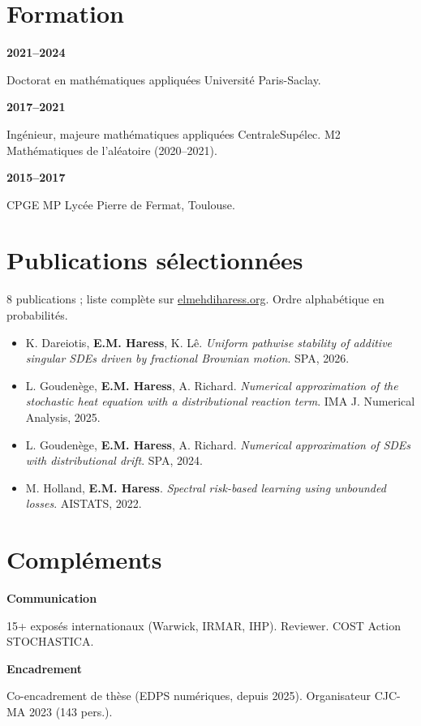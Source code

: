 \documentclass[10pt,a4paper]{article}
\newlength{\datecol}\setlength{\datecol}{0.155\textwidth}
\newlength{\gutter}\setlength{\gutter}{0.85em}
\newlength{\bodycol}
\newcommand{\skillrow}[2]{%
  \par\noindent
  \begin{minipage}[t]{\datecol}
    \vspace{0pt}\raggedright{\headingfont\bfseries\footnotesize #1}
  \end{minipage}%
  \hspace{\gutter}%
  \begin{minipage}[t]{\bodycol}
    \vspace{0pt}\raggedright\footnotesize #2
  \end{minipage}%
  \par\vspace{0.38ex}
}
\begin{document}
\section{Formation}
\skillrow{2021--2024}{Doctorat en mathématiques appliquées \textemdash{} Université Paris-Saclay.}
\skillrow{2017--2021}{Ingénieur, majeure mathématiques appliquées \textemdash{} CentraleSupélec. M2 Mathématiques de l'aléatoire (2020--2021).}
\skillrow{2015--2017}{CPGE MP \textemdash{} Lycée Pierre de Fermat, Toulouse.}

\section{Publications sélectionnées}
{\scriptsize\color{muted}8 publications ; liste complète sur \href{https://elmehdiharess.org}{elmehdiharess.org}. Ordre alphabétique en probabilités.\par}
\vspace{0.25ex}
\begin{itemize}[leftmargin=1.15em, itemsep=0.12ex, topsep=0pt, parsep=0pt, label={\textcolor{accent}{\scriptsize$\blacktriangleright$}}]
  \scriptsize
  \item K. Dareiotis, \textbf{E.M. Haress}, K. Lê. \emph{Uniform pathwise stability of additive singular SDEs
  driven by fractional Brownian motion}. SPA, 2026.
  \item L. Goudenège, \textbf{E.M. Haress}, A. Richard. \emph{Numerical approximation of the stochastic heat
  equation with a distributional reaction term}. IMA J. Numerical Analysis, 2025.
  \item L. Goudenège, \textbf{E.M. Haress}, A. Richard. \emph{Numerical approximation of SDEs with
  distributional drift}. SPA, 2024.
  \item M. Holland, \textbf{E.M. Haress}. \emph{Spectral risk-based learning using unbounded losses}. AISTATS, 2022.
\end{itemize}

\section{Compléments}
\skillrow{Communication}{15+ exposés internationaux (Warwick, IRMAR, IHP). Reviewer. COST Action STOCHASTICA.}
\skillrow{Encadrement}{Co-encadrement de thèse (EDPS numériques, depuis 2025). Organisateur CJC-MA 2023 (143 pers.).}
\end{document}
